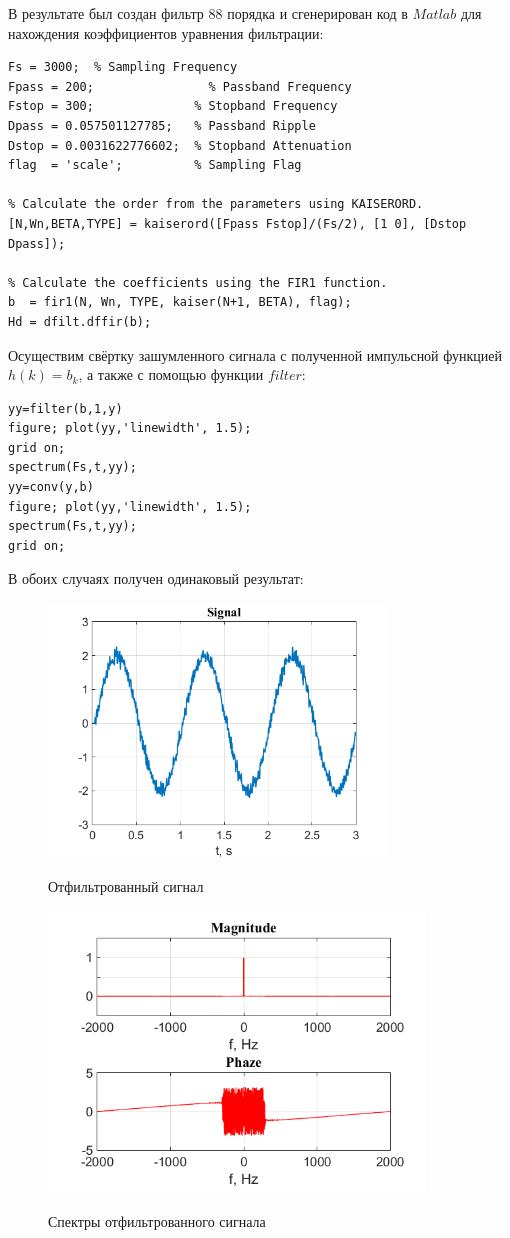 \documentclass[a4paper,14pt]{article}
\begin{document}
\hspace{0,5cm}В результате был создан фильтр $88$ порядка и сгенерирован код в $Matlab$ для нахождения коэффициентов уравнения фильтрации:

\begin{lstlisting}
Fs = 3000;  % Sampling Frequency
Fpass = 200;                % Passband Frequency
Fstop = 300;              % Stopband Frequency
Dpass = 0.057501127785;   % Passband Ripple
Dstop = 0.0031622776602;  % Stopband Attenuation
flag  = 'scale';          % Sampling Flag

% Calculate the order from the parameters using KAISERORD.
[N,Wn,BETA,TYPE] = kaiserord([Fpass Fstop]/(Fs/2), [1 0], [Dstop Dpass]);

% Calculate the coefficients using the FIR1 function.
b  = fir1(N, Wn, TYPE, kaiser(N+1, BETA), flag);
Hd = dfilt.dffir(b);
\end{lstlisting}
Осуществим свёртку зашумленного сигнала с полученной импульсной функцией $h(k) = b_k$, а также с помощью функции $filter$:

\begin{lstlisting}
yy=filter(b,1,y)
figure; plot(yy,'linewidth', 1.5);
grid on;
spectrum(Fs,t,yy);
yy=conv(y,b)
figure; plot(yy,'linewidth', 1.5);
spectrum(Fs,t,yy);
grid on;
\end{lstlisting}
\hspace{0,5cm} В обоих случаях получен одинаковый результат:

\begin{figure}[h]
\begin{multicols}{1}
\hfill
\includegraphics[width=90mm]{filtered}
\hfill
\caption{Отфильтрованный сигнал}
\label{figBottom}
\hfill
\includegraphics[width=100mm]{filtered_spec}
\hfill
\caption{Спектры отфильтрованного сигнала}
\label{figDown}
\end{multicols}
\end{figure}
\end{document}
